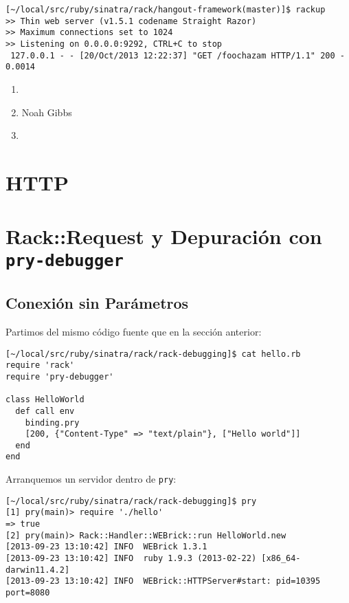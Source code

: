 
\begin{verbatim}
[~/local/src/ruby/sinatra/rack/hangout-framework(master)]$ rackup
>> Thin web server (v1.5.1 codename Straight Razor)
>> Maximum connections set to 1024
>> Listening on 0.0.0.0:9292, CTRL+C to stop
 127.0.0.1 - - [20/Oct/2013 12:22:37] "GET /foochazam HTTP/1.1" 200 - 0.0014
\end{verbatim}


\begin{enumerate}
\item 
{}
\item 
Noah Gibbs 
\item 
{}
\end{enumerate}

\section{HTTP}
\label{section:http}




\section{Rack::Request y Depuración con {\tt pry-debugger}}

\subsection{Conexión sin Parámetros}

Partimos del mismo código fuente que en la sección  anterior:
\begin{verbatim}
[~/local/src/ruby/sinatra/rack/rack-debugging]$ cat hello.rb 
require 'rack'
require 'pry-debugger'

class HelloWorld
  def call env
    binding.pry
    [200, {"Content-Type" => "text/plain"}, ["Hello world"]]
  end
end
\end{verbatim}


Arranquemos un servidor dentro de \verb|pry|:
\begin{verbatim}
[~/local/src/ruby/sinatra/rack/rack-debugging]$ pry
[1] pry(main)> require './hello'
=> true
[2] pry(main)> Rack::Handler::WEBrick::run HelloWorld.new
[2013-09-23 13:10:42] INFO  WEBrick 1.3.1
[2013-09-23 13:10:42] INFO  ruby 1.9.3 (2013-02-22) [x86_64-darwin11.4.2]
[2013-09-23 13:10:42] INFO  WEBrick::HTTPServer#start: pid=10395 port=8080
\end{verbatim}

